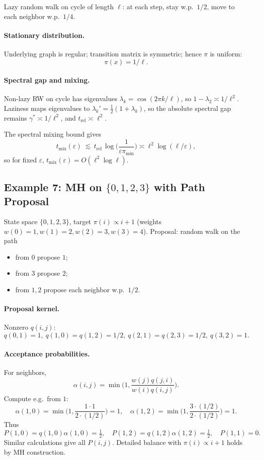 \documentclass[answers,12pt,addpoints]{exam}
\begin{document}
Lazy random walk on cycle of length $\ell$: at each step, stay w.p.\ $1/2$, move to each neighbor w.p.\ $1/4$.

\paragraph{Stationary distribution.}
Underlying graph is regular; transition matrix is symmetric; hence $\pi$ is uniform:
\[
\pi(x)=1/\ell.
\]

\paragraph{Spectral gap and mixing.}
Non-lazy RW on cycle has eigenvalues $\lambda_k = \cos(2\pi k/\ell)$, so $1-\lambda_2\asymp 1/\ell^2$. Laziness maps eigenvalues to $\lambda_k' = \tfrac12(1+\lambda_k)$, so the absolute spectral gap remains $\gamma^*\asymp 1/\ell^2$, and $t_\mathrm{rel}\asymp \ell^2$.

The spectral mixing bound gives
\[
t_\mathrm{mix}(\varepsilon)\ \lesssim\ t_\mathrm{rel}\,\log\!\Big(\frac{1}{\varepsilon\pi_{\min}}\Big)
\asymp \ell^2\log(\ell/\varepsilon),
\]
so for fixed $\varepsilon$, $t_\mathrm{mix}(\varepsilon)=O(\ell^2\log\ell)$.


\subsection*{Example 7: MH on $\{0,1,2,3\}$ with Path Proposal}

State space $\{0,1,2,3\}$, target $\pi(i)\propto i+1$ (weights $w(0)=1,w(1)=2,w(2)=3,w(3)=4$). Proposal: random walk on the path
\begin{itemize}
\item from $0$ propose $1$;
\item from $3$ propose $2$;
\item from $1,2$ propose each neighbor w.p.\ $1/2$.
\end{itemize}

\paragraph{Proposal kernel.}
Nonzero $q(i,j)$:
\[
q(0,1)=1,\ q(1,0)=q(1,2)=1/2,\ q(2,1)=q(2,3)=1/2,\ q(3,2)=1.
\]

\paragraph{Acceptance probabilities.}
For neighbors,
\[
\alpha(i,j)=\min\Big(1,\frac{w(j)q(j,i)}{w(i)q(i,j)}\Big).
\]
Compute e.g.\ from $1$:
\[
\alpha(1,0)=\min\Big(1,\frac{1\cdot 1}{2\cdot(1/2)}\Big)=1,\quad
\alpha(1,2)=\min\Big(1,\frac{3\cdot(1/2)}{2\cdot(1/2)}\Big)=1.
\]
Thus
\[
P(1,0)=q(1,0)\alpha(1,0)=\tfrac12,\quad
P(1,2)=q(1,2)\alpha(1,2)=\tfrac12,\quad P(1,1)=0.
\]
Similar calculations give all $P(i,j)$. Detailed balance with $\pi(i)\propto i+1$ holds by MH construction.
\end{document}
